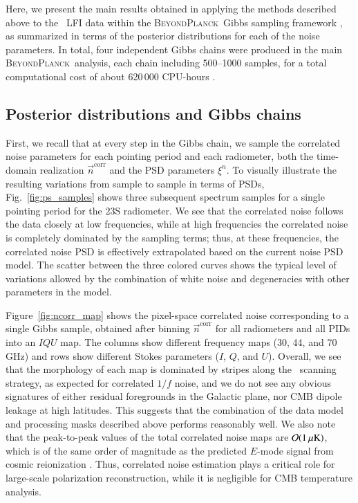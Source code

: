 \documentclass{aa}
\newcommand{\n}[0]{\vec{n}}
\newcommand{\BP}{\textsc{BeyondPlanck}}
\begin{document}
Here, we present the main results obtained in applying the
methods described above to the \Planck\ LFI data within the \BP\ Gibbs
sampling framework \citep{bp01}, as summarized in terms of the
posterior distributions for each of the noise parameters. In total,
four independent Gibbs chains were produced in the main \BP\ analysis,
each chain including 500--1000 samples, for a total computational cost
of about 620\,000 CPU-hours \citep{bp01,bp03}.

\subsection{Posterior distributions and Gibbs chains}

First, we recall that at every step in the Gibbs chain, we sample the
correlated noise parameters for each pointing period and each
radiometer, both the time-domain realization $\n^{\mathrm{corr}}$ and
the PSD parameters $\xi^n$. To visually illustrate the resulting
variations from sample to sample in terms of PSDs,
Fig.~\ref{fig:ps_samples} shows three subsequent spectrum samples for
a single pointing period for the 23S radiometer. We see that the
correlated noise follows the data closely at low frequencies, while at
high frequencies the correlated noise is completely dominated by the
sampling terms; thus, at these frequencies, the correlated noise PSD is 
effectively extrapolated based on the current noise PSD model. 
The scatter between the three colored curves shows the typical
level of variations allowed by the combination of white noise and
degeneracies with other parameters in the model.

Figure~\ref{fig:ncorr_map} shows the pixel-space correlated noise 
corresponding to a single Gibbs sample, obtained
after binning $\n^{\mathrm{corr}}$ for all radiometers and all PIDs
into an $IQU$ map. The columns show different frequency maps (30, 44, and
70\,GHz) and rows show different Stokes parameters ($I$, $Q$, and
$U$). Overall, we see that the morphology of each map is dominated by
stripes along the \Planck\ scanning strategy, as expected for
correlated $1/f$ noise, and we do not see any obvious signatures of
either residual foregrounds in the Galactic plane, nor CMB dipole
leakage at high latitudes. This suggests that the combination of the
data model and processing masks described above performs reasonably
well. We also note that the peak-to-peak values of the total
correlated noise maps are $\mathcal{O}(1\muK)$, which is of the same
order of magnitude as the predicted $E$-mode signal from cosmic reionization
\citep{planck2016-l04}. Thus, correlated noise estimation plays a
critical role for large-scale polarization reconstruction, while it is
negligible for CMB temperature analysis.
\end{document}
